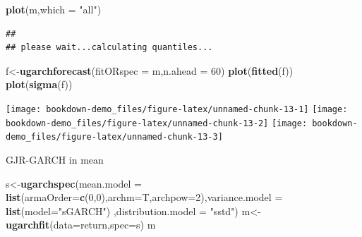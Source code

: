 \documentclass[
  12pt,
  a4paper,
  openany]{book}
\newenvironment{Shaded}{\begin{snugshade}}{\end{snugshade}}
\newcommand{\DataTypeTok}[1]{\textcolor[rgb]{0.13,0.29,0.53}{#1}}
\newcommand{\DecValTok}[1]{\textcolor[rgb]{0.00,0.00,0.81}{#1}}
\newcommand{\KeywordTok}[1]{\textcolor[rgb]{0.13,0.29,0.53}{\textbf{#1}}}
\newcommand{\NormalTok}[1]{#1}
\newcommand{\StringTok}[1]{\textcolor[rgb]{0.31,0.60,0.02}{#1}}
\begin{document}
\begin{Shaded}
\begin{Highlighting}[]
\KeywordTok{plot}\NormalTok{(m,}\DataTypeTok{which =} \StringTok{"all"}\NormalTok{)}
\end{Highlighting}
\end{Shaded}

\begin{verbatim}
## 
## please wait...calculating quantiles...
\end{verbatim}

\begin{Shaded}
\begin{Highlighting}[]
\NormalTok{f\textless{}{-}}\KeywordTok{ugarchforecast}\NormalTok{(}\DataTypeTok{fitORspec =}\NormalTok{ m,}\DataTypeTok{n.ahead =} \DecValTok{60}\NormalTok{)}
\KeywordTok{plot}\NormalTok{(}\KeywordTok{fitted}\NormalTok{(f))}
\KeywordTok{plot}\NormalTok{(}\KeywordTok{sigma}\NormalTok{(f))}
\end{Highlighting}
\end{Shaded}

\begin{center}\texttt{[image: bookdown-demo\_files/figure-latex/unnamed-chunk-13-1]} \texttt{[image: bookdown-demo\_files/figure-latex/unnamed-chunk-13-2]} \texttt{[image: bookdown-demo\_files/figure-latex/unnamed-chunk-13-3]} \end{center}

GJR-GARCH in mean

\begin{Shaded}
\begin{Highlighting}[]
\NormalTok{s\textless{}{-}}\KeywordTok{ugarchspec}\NormalTok{(}\DataTypeTok{mean.model =} \KeywordTok{list}\NormalTok{(}\DataTypeTok{armaOrder=}\KeywordTok{c}\NormalTok{(}\DecValTok{0}\NormalTok{,}\DecValTok{0}\NormalTok{),}\DataTypeTok{archm=}\NormalTok{T,}\DataTypeTok{archpow=}\DecValTok{2}\NormalTok{),}\DataTypeTok{variance.model =} \KeywordTok{list}\NormalTok{(}\DataTypeTok{model=}\StringTok{"sGARCH"}\NormalTok{)}
\NormalTok{              ,}\DataTypeTok{distribution.model =} \StringTok{"sstd"}\NormalTok{)}
\NormalTok{m\textless{}{-}}\KeywordTok{ugarchfit}\NormalTok{(}\DataTypeTok{data=}\NormalTok{return,}\DataTypeTok{spec=}\NormalTok{s)}
\NormalTok{m}
\end{Highlighting}
\end{Shaded}
\end{document}
